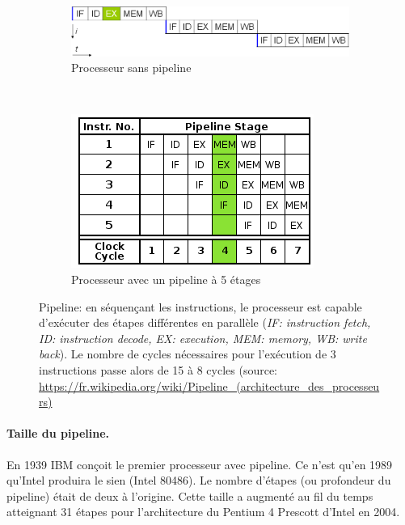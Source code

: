 \begin{figure}
    \begin{subfigure}[]{0.5\linewidth}\centering
        \vspace{1.6cm}
        \includegraphics[width=\linewidth]{images/Chapitre1/pipelineNo.png}
        \caption{Processeur sans pipeline \label{pic_pip_no}}
    \end{subfigure}%
    ~ %
    \begin{subfigure}[]{0.5\linewidth}\centering
        \includegraphics[width=.7\linewidth]{images/Chapitre1/pipelineYes.png}
        \caption{Processeur avec un pipeline à 5 étages \label{pic_pip_yes}}
    \end{subfigure}
    
    \caption{Pipeline: en séquençant les instructions, le processeur est capable d'exécuter des étapes différentes en parallèle (\textit{IF: instruction fetch, ID: instruction decode, EX: execution, MEM: memory, WB: write back}). Le nombre de cycles nécessaires pour l'exécution de 3 instructions passe alors de 15 à 8 cycles (source: \url{https://fr.wikipedia.org/wiki/Pipeline_(architecture_des_processeurs)} }
    \label{pic_pipeline}
\end{figure}




\paragraph{Taille du pipeline.}
En 1939 IBM conçoit le premier processeur avec pipeline. Ce n'est qu'en 1989 qu'Intel produira le sien (Intel 80486). Le nombre d'étapes (ou profondeur du pipeline) était de deux à l'origine. Cette taille a augmenté au fil du temps atteignant 31 étapes pour l'architecture du Pentium 4 Prescott d'Intel en 2004. 

